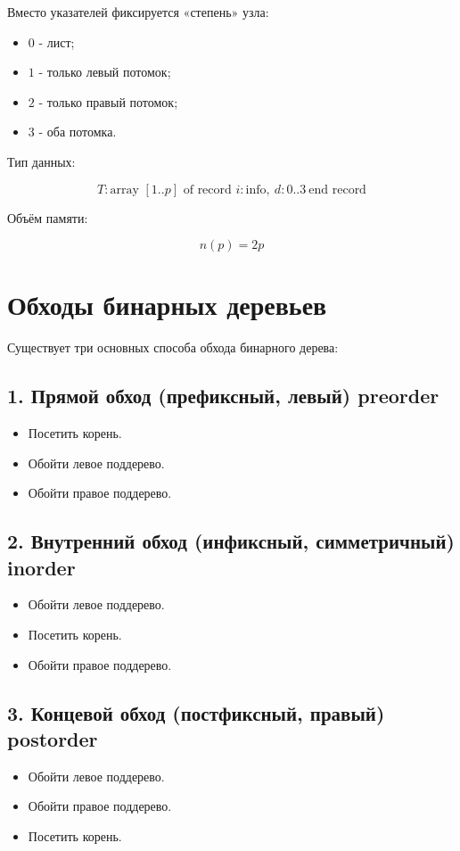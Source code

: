 {Вместо указателей фиксируется «степень» узла:
\begin{itemize}
  \item $0$ - лист;
  \item $1$ - только левый потомок;
  \item $2$ - только правый потомок;
  \item $3$ - оба потомка.
\end{itemize}

Тип данных:


\[
T : \text{array } [1..p] \text{ of record } i : \text{info},\ d : 0..3\ \text{end record}
\]



Объём памяти:


\[
n(p) = 2p
\]



\section*{Обходы бинарных деревьев}

Существует три основных способа обхода бинарного дерева:

\subsection*{1. Прямой обход (префиксный, левый) preorder}
\begin{itemize}
  \item Посетить корень.
  \item Обойти левое поддерево.
  \item Обойти правое поддерево.
\end{itemize}

\subsection*{2. Внутренний обход (инфиксный, симметричный) inorder}
\begin{itemize}
  \item Обойти левое поддерево.
  \item Посетить корень.
  \item Обойти правое поддерево.
\end{itemize}

\subsection*{3. Концевой обход (постфиксный, правый) postorder}
\begin{itemize}
  \item Обойти левое поддерево.
  \item Обойти правое поддерево.
  \item Посетить корень.
\end{itemize}

}
